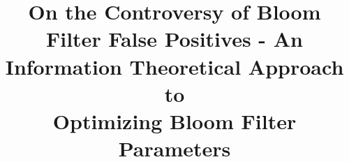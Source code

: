 \documentclass[10pt, conference, letterpaper]{IEEEtran}
\title{On the Controversy of Bloom Filter False Positives - An Information Theoretical Approach to\\Optimizing Bloom Filter Parameters}
\begin{document}
\maketitle







%


%
 \balance
 


\end{document}
